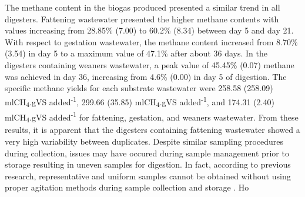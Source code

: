The methane content in the biogas produced presented a similar trend in all digesters. Fattening wastewater presented the higher methane contents with values increasing from 28.85\% (7.00) to 60.2\% (8.34) between day 5 and day 21. With respect to gestation wastewater, the methane content increased from 8.70\% (3.54) in day 5 to a maximum value of 47.1\% after about 36 days. In the digesters containing weaners wastewater, a peak value of 45.45\% (0.07) methane was achieved in day 36, increasing from 4.6\% (0.00) in day 5 of digestion. The specific methane yields for each substrate wastewater were 258.58 (258.09) mlCH\textsubscript{4}.gVS added\textsuperscript{-1}, 299.66 (35.85) mlCH\textsubscript{4}.gVS added\textsuperscript{-1}, and 174.31 (2.40) mlCH\textsubscript{4}.gVS added\textsuperscript{-1} for fattening, gestation, and weaners wastewater. From these results, it is apparent that the digesters containing fattening wastewater showed a very high variability between duplicates. Despite similar sampling procedures during collection, issues may have occured during sample management prior to storage resulting in uneven samples for digestion. In fact,  according to previous research, representative and uniform samples cannot be obtained without using proper agitation methods during sample collection and storage \cite{Zhu_2004}. Ho 